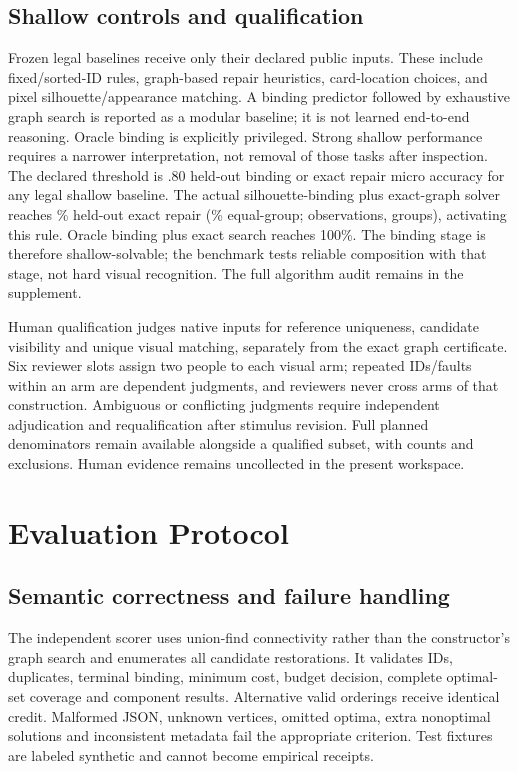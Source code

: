 \documentclass[10pt,twocolumn,letterpaper]{article}
\begin{document}
\subsection{Shallow controls and qualification}
Frozen legal baselines receive only their declared public inputs.
These include fixed/sorted-ID rules, graph-based repair heuristics,
card-location choices, and pixel silhouette/appearance matching.
A binding predictor followed by exhaustive graph search is reported
as a modular baseline; it is not learned end-to-end reasoning.
Oracle binding is explicitly privileged. Strong shallow performance
requires a narrower interpretation, not removal of those tasks after
inspection. The declared threshold is .80 held-out binding or exact
repair micro accuracy for any legal shallow baseline.
The actual silhouette-binding plus exact-graph solver reaches
\VRPixelMicro{}\% held-out exact repair
(\VRPixelMacro{}\% equal-group; \VRHeldoutN{} observations,
\VRHeldoutGroups{} groups), activating this rule.
Oracle binding plus exact search reaches 100\%.
The binding stage is therefore shallow-solvable; the benchmark
tests reliable composition with that stage, not hard visual
recognition. The full algorithm audit remains in the supplement.

Human qualification judges native inputs for reference uniqueness,
candidate visibility and unique visual matching, separately from the
exact graph certificate. Six reviewer slots assign two people to
each visual arm; repeated IDs/faults within an arm are dependent
judgments, and reviewers never cross arms of that construction.
Ambiguous or conflicting judgments require independent adjudication and requalification after
stimulus revision. Full planned denominators remain available
alongside a qualified subset, with counts and exclusions.
Human evidence remains uncollected in the present workspace.

\section{Evaluation Protocol}
\subsection{Semantic correctness and failure handling}
The independent scorer uses union-find connectivity rather than the
constructor's graph search and enumerates all candidate restorations.
It validates IDs, duplicates, terminal binding, minimum cost, budget
decision, complete optimal-set coverage and component results.
Alternative valid orderings receive identical credit. Malformed JSON,
unknown vertices, omitted optima, extra nonoptimal solutions and
inconsistent metadata fail the appropriate criterion. Test fixtures
are labeled synthetic and cannot become empirical receipts.
\end{document}
